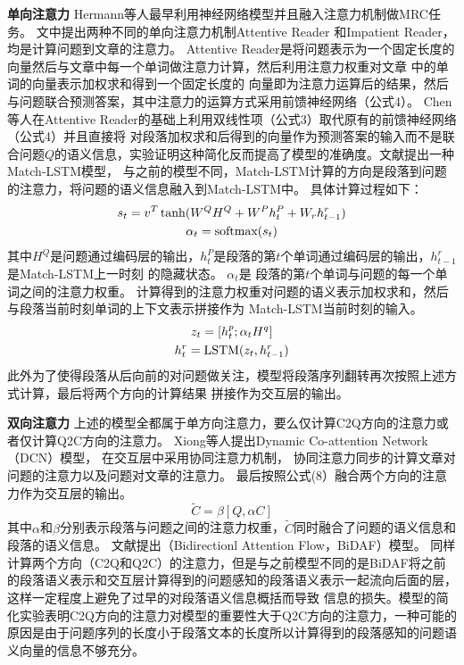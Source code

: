 \noindent\textbf{单向注意力} \quad Hermann等人\cite{Hermann}最早利用神经网络模型并且融入注意力机制做MRC任务。
文中提出两种不同的单向注意力机制Attentive Reader
和Impatient Reader，均是计算问题到文章的注意力。
Attentive Reader是将问题表示为一个固定长度的向量然后与文章中每一个单词做注意力计算，然后利用注意力权重对文章
中的单词的向量表示加权求和得到一个固定长度的
向量即为注意力运算后的结果，然后与问题联合预测答案，其中注意力的运算方式采用前馈神经网络（公式4）。
Chen等人\cite{AR}在Attentive Reader的基础上利用双线性项（公式3）取代原有的前馈神经网络（公式4）并且直接将
对段落加权求和后得到的向量作为预测答案的输入而不是联合问题$Q$的语义信息，实验证明这种简化反而提高了模型的准确度。文献\cite{MatchLSTM}提出一种Match-LSTM模型，
与之前的模型不同，Match-LSTM计算的方向是段落到问题的注意力，将问题的语义信息融入到Match-LSTM中。
具体计算过程如下：
\begin{gather}
s_t=v^T\tanh(W^QH^Q+W^Ph_t^P+W_rh_{t-1}^r) \notag \\
\alpha_{t}=\text{softmax}(s_t)
\end{gather}
其中$H^Q$是问题通过编码层的输出，$h_t^P$是段落的第$t$个单词通过编码层的输出，$h_{t-1}^r$是Match-LSTM上一时刻
的隐藏状态。
$\alpha_{t}$是
段落的第$t$个单词与问题的每一个单词之间的注意力权重。
计算得到的注意力权重对问题的语义表示加权求和，然后与段落当前时刻单词的上下文表示拼接作为
Match-LSTM当前时刻的输入。
\begin{gather}
z_t=[h_t^p;\alpha_tH^q] \notag \\
h_{t}^r=\text{LSTM}(z_t,h_{t-1}^r)
\end{gather}
此外为了使得段落从后向前的对问题做关注，模型将段落序列翻转再次按照上述方式计算，最后将两个方向的计算结果
拼接作为交互层的输出。
\vspace{1ex}

\noindent \textbf{双向注意力} \quad 上述的模型全都属于单方向注意力，要么仅计算C2Q方向的注意力或者仅计算Q2C方向的注意力。
Xiong等人\cite{DCN}提出Dynamic Co-attention Network（DCN）模型，
在交互层中采用协同注意力机制，
协同注意力同步的计算文章对问题的注意力以及问题对文章的注意力。
最后按照公式(8）融合两个方向的注意力作为交互层的输出。
\begin{equation}
\widetilde{C}=\beta[Q,\alpha C]
\end{equation}
其中$\alpha$和$\beta$分别表示段落与问题之间的注意力权重，$\widetilde{C}$同时融合了问题的语义信息和段落的语义信息。
文献\cite{BiDAF}提出（Bidirectionl Attention Flow，BiDAF）模型。
同样计算两个方向（C2Q和Q2C）的注意力，但是与之前模型不同的是BiDAF将之前的段落语义表示和交互层计算得到的问题感知的段落语义表示一起流向后面的层，这样一定程度上避免了过早的对段落语义信息概括而导致
信息的损失。模型的简化实验表明C2Q方向的注意力对模型的重要性大于Q2C方向的注意力，一种可能的原因是由于问题序列的长度小于段落文本的长度所以计算得到的段落感知的问题语义向量的信息不够充分。
\vspace{1ex}

